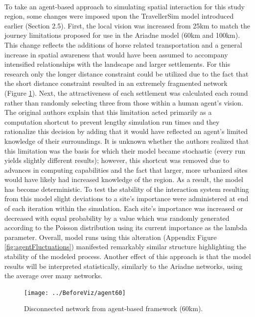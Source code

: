 \documentclass[12pt,a4paper]{thesis}
\begin{document}
\paragraph{}
To take an agent-based approach to simulating spatial interaction for this study region, some changes were imposed upon the TravellerSim model introduced earlier (Section 2.5). First, the local vision was increased from 25km to match the journey limitations proposed for use in the Ariadne model (60km and 100km). This change reflects the additions of horse related transportation and a general increase in spatial awareness that would have been assumed to accompany intensified relationships with the landscape and larger settlements. For this research only the longer distance constraint could be utilized due to the fact that the short distance constraint resulted in an extremely fragmented network (Figure \ref{fig:agent60}). Next, the attractiveness of each settlement was calculated each round rather than randomly selecting three from those within a human agent's vision. The original authors \citep{GraSte08} explain that this limitation acted primarily as a computation shortcut to prevent lengthy simulation run times and they rationalize this decision by adding that it would have reflected an agent's limited knowledge of their surroundings. It is unknown whether the authors realized that this limitation was the basis for which their model became stochastic (every run yields slightly different results); however, this shortcut was removed due to advances in computing capabilities and the fact that larger, more urbanized sites would have likely had increased knowledge of the region. As a result, the model has become deterministic. To test the stability of the interaction system resulting from this model slight deviations to a site's importance were administered at end of each iteration within the simulation. Each site's importance was increased or decreased with equal probability by a value which was randomly generated according to the Poisson distribution using its current importance as the lambda parameter. Overall, model runs using this alteration (Appendix Figure \ref{fig:agentFluctuations}) manifested remarkably similar structure highlighting the stability of the modeled process. Another effect of this approach is that the model results will be interpreted statistically, similarly to the Ariadne networks, using the average over many networks.  

\begin{figure}
\centering
\texttt{[image: ../BeforeViz/agent60]}
\caption{Disconnected network from agent-based framework (60km).}
\label{fig:agent60}
\end{figure}
\end{document}
